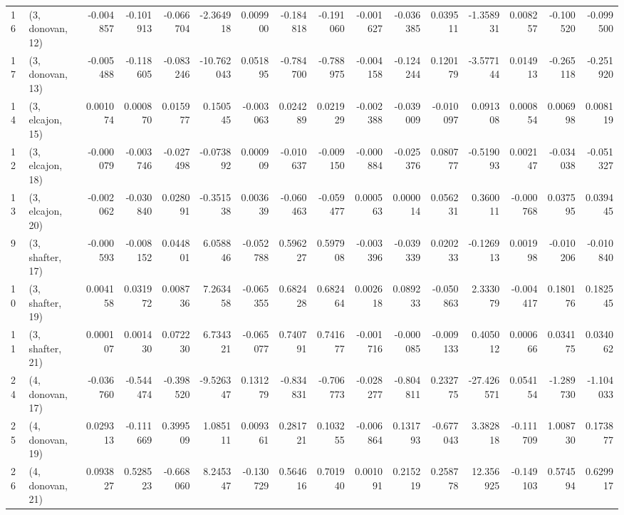\begin{tabular}{llrrrrrrrrrrrrrr}
16 &  (3, donovan, 12) &  -0.004857 & -0.101913 & -0.066704 &  -2.364918 &  0.009900 &  -0.184818 & -0.191060 & -0.001627 & -0.036385 &  0.039511 &  -1.358931 &  0.008257 & -0.100520 & -0.099500 \\
17 &  (3, donovan, 13) &  -0.005488 & -0.118605 & -0.083246 & -10.762043 &  0.051895 &  -0.784700 & -0.788975 & -0.004158 & -0.124244 &  0.120179 &  -3.577144 &  0.014913 & -0.265118 & -0.251920 \\
14 &  (3, elcajon, 15) &   0.001074 &  0.000870 &  0.015977 &   0.150545 & -0.003063 &   0.024289 &  0.021929 & -0.002388 & -0.039009 & -0.010097 &   0.091308 &  0.000854 &  0.006998 &  0.008119 \\
12 &  (3, elcajon, 18) &  -0.000079 & -0.003746 & -0.027498 &  -0.073892 &  0.000909 &  -0.010637 & -0.009150 & -0.000884 & -0.025376 &  0.080777 &  -0.519093 &  0.002147 & -0.034038 & -0.051327 \\
13 &  (3, elcajon, 20) &  -0.002062 & -0.030840 &  0.028091 &  -0.351538 &  0.003639 &  -0.060463 & -0.059477 &  0.000563 &  0.000014 &  0.056231 &   0.360011 & -0.000768 &  0.037595 &  0.039445 \\
9  &  (3, shafter, 17) &  -0.000593 & -0.008152 &  0.044801 &   6.058846 & -0.052788 &   0.596227 &  0.597908 & -0.003396 & -0.039339 &  0.020233 &  -0.126913 &  0.001998 & -0.010206 & -0.010840 \\
10 &  (3, shafter, 19) &   0.004158 &  0.031972 &  0.008736 &   7.263458 & -0.065355 &   0.682428 &  0.682464 &  0.002618 &  0.089233 & -0.050863 &   2.333079 & -0.004417 &  0.180176 &  0.182545 \\
11 &  (3, shafter, 21) &   0.000107 &  0.001430 &  0.072230 &   6.734321 & -0.065077 &   0.740791 &  0.741677 & -0.001716 & -0.000085 & -0.009133 &   0.405012 &  0.000666 &  0.034175 &  0.034062 \\
24 &  (4, donovan, 17) &  -0.036760 & -0.544474 & -0.398520 &  -9.526347 &  0.131279 &  -0.834831 & -0.706773 & -0.028277 & -0.804811 &  0.232775 & -27.426571 &  0.054154 & -1.289730 & -1.104033 \\
25 &  (4, donovan, 19) &   0.029313 & -0.111669 &  0.399509 &   1.085111 &  0.009361 &   0.281721 &  0.103255 & -0.006864 &  0.131793 & -0.677043 &   3.382818 & -0.111709 &  1.008730 &  0.173877 \\
26 &  (4, donovan, 21) &   0.093827 &  0.528523 & -0.668060 &   8.245347 & -0.130729 &   0.564616 &  0.701940 &  0.001091 &  0.215219 &  0.258778 &  12.356925 & -0.149103 &  0.574594 &  0.629917 \\

\end{tabular}
